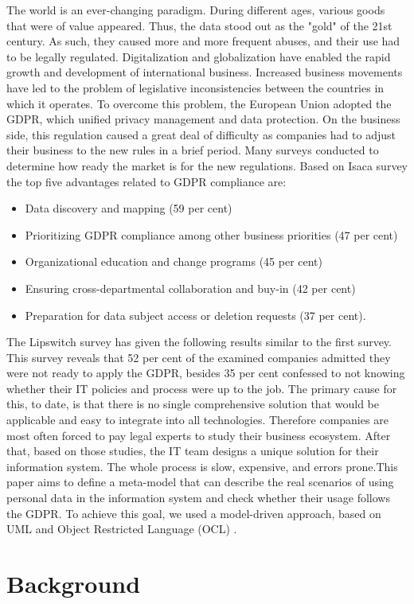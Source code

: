 \documentclass[11pt,english]{article}
\begin{document}
\quad The world is an ever-changing paradigm. During different ages, various goods that were of value appeared. Thus, the data stood out as the "gold" of the 21st century. As such, they caused more and more frequent abuses, and their use had to be legally regulated. Digitalization and globalization have enabled the rapid growth and development of international business. Increased business movements have led to the problem of legislative inconsistencies between the countries in which it operates. To overcome this problem, the European Union adopted the GDPR, which unified privacy management and data protection. On the business side, this regulation caused a great deal of difficulty as companies had to adjust their business to the new rules in a brief period.
\newline \quad Many surveys conducted to determine how ready the market is for the new regulations. Based on Isaca survey \cite{isaca} the top five advantages related to GDPR compliance are:
\begin{itemize}
  \item Data discovery and mapping (59 per cent)
  \item Prioritizing GDPR compliance among other business priorities (47 per cent)
  \item Organizational education and change programs (45 per cent)
  \item Ensuring cross-departmental collaboration and buy-in (42 per cent)
  \item Preparation for data subject access or deletion requests (37 per cent).
\end{itemize}
\quad The Lipswitch survey\cite{lipswitch} has given the following results similar to the first survey. This survey reveals that 52 per cent of the examined companies admitted they were not ready to apply the GDPR, besides 35 per cent confessed to not knowing whether their IT policies and process were up to the job. The primary cause for this, to date, is that there is no single comprehensive solution that would be applicable and easy to integrate into all technologies. Therefore companies are most often forced to pay legal experts to study their business ecosystem. After that, based on those studies, the IT team designs a unique solution for their information system. The whole process is slow, expensive, and errors prone.\newline This paper aims to define a meta-model that can describe the real scenarios of using personal data in the information system and check whether their usage follows the GDPR. To achieve this goal, we used a model-driven approach, based on UML and Object Restricted Language (OCL) \cite{ocl}.
\section{Background}
\printbibliography
\end{document}
